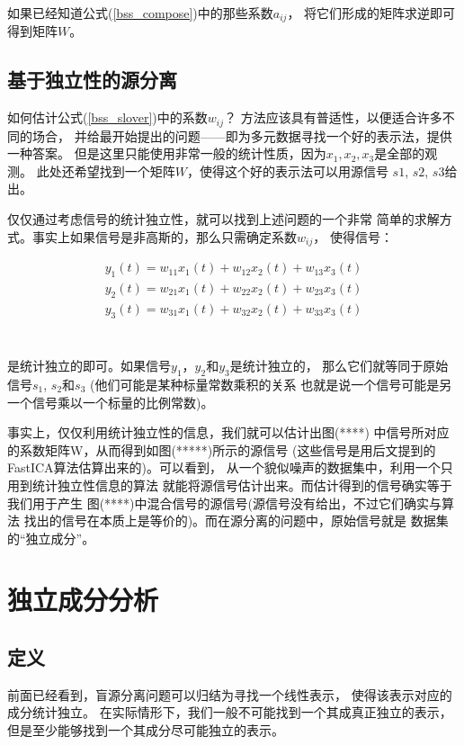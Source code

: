 如果已经知道公式(\ref{bss_compose})中的那些系数$a_{ij}$，
将它们形成的矩阵求逆即可得到矩阵$W$。
    
\subsection{基于独立性的源分离}
如何估计公式(\ref{bss_slover})中的系数$w_{ij}$？
方法应该具有普适性，以便适合许多不同的场合，
并给最开始提出的问题——即为多元数据寻找一个好的表示法，提供一种答案。
但是这里只能使用非常一般的统计性质，因为$x_1, x_2, x_3$是全部的观测。
此处还希望找到一个矩阵$W$，使得这个好的表示法可以用源信号
$s1$, $s2$, $s3$给出。
    
仅仅通过考虑信号的统计独立性，就可以找到上述问题的一个非常
简单的求解方式。事实上如果信号是非高斯的，那么只需确定系数$w_{ij}$，
使得信号：\\
\parbox{10cm}{
\begin{eqnarray*}
y_1(t)=w_{11}x_1(t)+w_{12}x_2(t)+w_{13}x_3(t) \\
y_2(t)=w_{21}x_1(t)+w_{22}x_2(t)+w_{23}x_3(t) \\
y_3(t)=w_{31}x_1(t)+w_{32}x_2(t)+w_{33}x_3(t) \\
\end{eqnarray*}
}\hfill
\parbox{3cm}{\begin{eqnarray}\label{bss_slover} \end{eqnarray}}

是统计独立的即可。如果信号$y_1$，$y_2$和$y_3$是统计独立的，
那么它们就等同于原始信号$s_1$, $s_2$和$s_3$
(他们可能是某种标量常数乘积的关系
也就是说一个信号可能是另一个信号乘以一个标量的比例常数)。

事实上，仅仅利用统计独立性的信息，我们就可以估计出图(****)
中信号所对应的系数矩阵W，从而得到如图(*****)所示的源信号
(这些信号是用后文提到的FastICA算法估算出来的)。可以看到，
从一个貌似噪声的数据集中，利用一个只用到统计独立性信息的算法
就能将源信号估计出来。而估计得到的信号确实等于我们用于产生
图(****)中混合信号的源信号(源信号没有给出，不过它们确实与算法
找出的信号在本质上是等价的)。而在源分离的问题中，原始信号就是
数据集的“独立成分”。


\section{独立成分分析}
\subsection{定义}
前面已经看到，盲源分离问题可以归结为寻找一个线性表示，
使得该表示对应的成分统计独立。
在实际情形下，我们一般不可能找到一个其成真正独立的表示，
但是至少能够找到一个其成分尽可能独立的表示。

